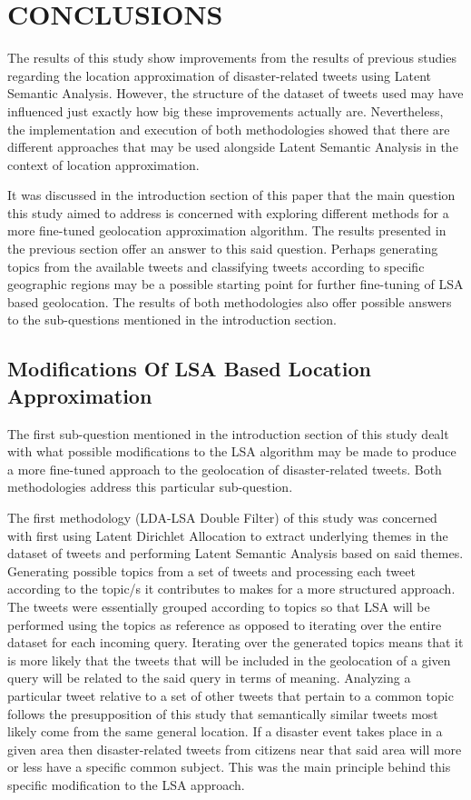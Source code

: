 \chapter{CONCLUSIONS}
The results of this study show improvements from the results of previous studies regarding the location approximation of disaster-related tweets using Latent Semantic Analysis. However, the structure of the dataset of tweets used may have influenced just exactly how big these improvements actually are. Nevertheless, the implementation and execution of both methodologies showed that there are different approaches that may be used alongside Latent Semantic Analysis in the context of location approximation. 

It was discussed in the introduction section of this paper that the main question this study aimed to address is concerned with exploring different methods for a more fine-tuned geolocation approximation algorithm. The results presented in the previous section offer an answer to this said question. Perhaps generating topics from the available tweets and classifying tweets according to specific geographic regions may be a possible starting point for further fine-tuning of LSA based geolocation. The results of both methodologies also offer possible answers to the sub-questions mentioned in the introduction section.

\section{Modifications Of LSA Based Location Approximation}
The first sub-question mentioned in the introduction section of this study dealt with what possible modifications to the LSA algorithm may be made to produce a more fine-tuned approach to the geolocation of disaster-related tweets. Both methodologies address this particular sub-question.

The first methodology (LDA-LSA Double Filter) of this study was concerned with first using Latent Dirichlet Allocation to extract underlying themes in the dataset of tweets and performing Latent Semantic Analysis based on said themes. Generating possible topics from a set of tweets and processing each tweet according to the topic/s it contributes to makes for a more structured approach. The tweets were essentially grouped according to topics so that LSA will be performed using the topics as reference as opposed to iterating over the entire dataset for each incoming query. Iterating over the generated topics means that it is more likely that the tweets that will be included in the geolocation of a given query will be related to the said query in terms of meaning. Analyzing a particular tweet relative to a set of other tweets that pertain to a common topic follows the presupposition of this study that semantically similar tweets most likely come from the same general location. If a disaster event takes place in a given area then disaster-related tweets from citizens near that said area will more or less have a specific common subject. This was the main principle behind this specific modification to the LSA approach.

